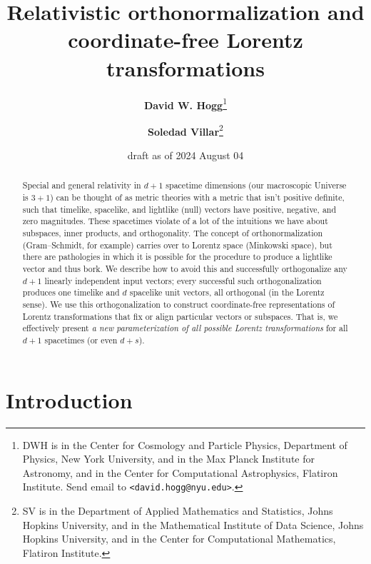 \documentclass{article}
\title{\bfseries Relativistic orthonormalization and coordinate-free Lorentz transformations}
\author{\textbf{David W. Hogg}\footnote{DWH is in the Center for Cosmology and Particle Physics, Department of Physics, New York University, and in the Max Planck Institute for Astronomy, and in the Center for Computational Astrophysics, Flatiron Institute. Send email to \texttt{<david.hogg@nyu.edu>}.}
        \and
        \textbf{Soledad Villar}\footnote{SV is in the Department of Applied Mathematics and Statistics, Johns Hopkins University, and in the Mathematical Institute of Data Science, Johns Hopkins University, and in the Center for Computational Mathematics, Flatiron Institute.}}
\date{draft as of 2024 August 04}
\newcommand{\plus}{\!+\!} %
\begin{document}
\thispagestyle{plain}
\maketitle

\begin{abstract}\noindent
    Special and general relativity in $d\plus1$ spacetime dimensions (our macroscopic Universe is $3\plus1$) can be thought of as metric theories with a metric that isn't positive definite, such that timelike, spacelike, and lightlike (null) vectors have positive, negative, and zero magnitudes.
    These spacetimes violate of a lot of the intuitions we have about subspaces, inner products, and orthogonality.
    The concept of orthonormalization (Gram--Schmidt, for example) carries over to Lorentz space (Minkowski space), but there are pathologies in which it is possible for the procedure to produce a lightlike vector and thus bork.
    We describe how to avoid this and successfully orthogonalize any $d+1$ linearly independent input vectors; every successful such orthogonalization produces one timelike and $d$ spacelike unit vectors, all orthogonal (in the Lorentz sense).
    We use this orthogonalization to construct coordinate-free representations of Lorentz transformations that fix or align particular vectors or subspaces.
    That is, we effectively present \emph{a new parameterization of all possible Lorentz transformations} for all $d\plus1$ spacetimes (or even $d\plus s$).
\end{abstract}

\section{Introduction}\label{sec:intro}
\end{document}
